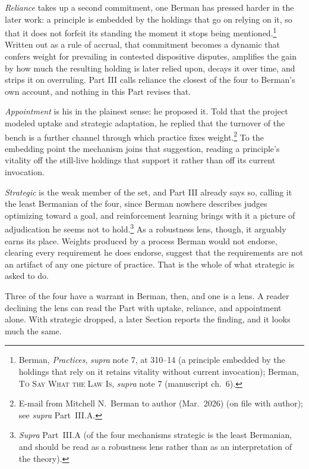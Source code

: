 \textit{Reliance} takes up a second commitment, one Berman has pressed
harder in the later work: a principle is embedded by the holdings that go
on relying on it, so that it does not forfeit its standing the moment it
stops being mentioned.\footnote{Berman, \textit{Practices},
\textit{supra} note 7, at 310--14 (a principle embedded by the holdings
that rely on it retains vitality without current invocation); Berman,
\textsc{To Say What the Law Is}, \textit{supra} note 7 (manuscript ch.\
6).} Written out as a rule of accrual, that commitment becomes a dynamic that
confers weight for prevailing in contested dispositive disputes, amplifies
the gain by how much the resulting holding is later relied upon, decays it
over time, and strips it on overruling. Part
III calls reliance the closest of the four to Berman's own account, and
nothing in this Part revises that.

\textit{Appointment} is his in the plainest sense: he proposed it. Told
that the project modeled uptake and strategic adaptation, he replied that
the turnover of the bench is a further channel through which practice
fixes weight.\footnote{E-mail from Mitchell N.\ Berman to author (Mar.\
2026) (on file with author); see \textit{supra} Part~III.A.} To the embedding point the mechanism joins that suggestion, reading a
principle's vitality off the still-live holdings that support it rather
than off its current invocation.

\textit{Strategic} is the weak member of the set, and Part III already
says so, calling it the least Bermanian of the four, since Berman nowhere
describes judges optimizing toward a goal, and reinforcement learning brings with it a picture of adjudication he
seems not to hold.\footnote{\textit{Supra} Part~III.A (of the four mechanisms strategic is the
least Bermanian, and should be read as a robustness lens rather than as an
interpretation of the theory).} As a robustness lens, though, it arguably earns its place. Weights produced by a process Berman would not endorse, clearing every
requirement he does endorse, suggest that the requirements are not an
artifact of any one picture of practice. That is the whole of what
strategic is asked to do.

Three of the four have a warrant in Berman, then, and one is a lens. A reader
declining the lens can read the Part with uptake, reliance, and appointment
alone. With strategic dropped, a later Section reports the finding, and it looks much
the same.

